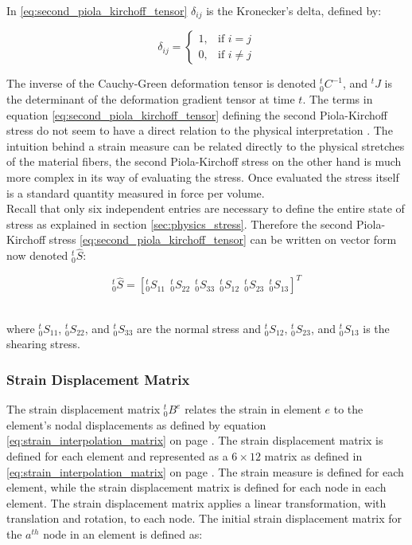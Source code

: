 In \eqref{eq:second_piola_kirchoff_tensor} $\delta_{ij}$ is the
Kronecker's delta, defined by:

\begin{equation}
  \delta_{ij} = \left\{\begin{matrix} 1, & \mbox{if } i=j \\ 0, &
      \mbox{if } i \ne j \end{matrix}\right. 
\end{equation}

The inverse of the Cauchy-Green deformation tensor is denoted
$^t_0C^{-1}$, and $^tJ$ is the determinant of the
deformation gradient tensor at time $t$.
%
The terms in equation \eqref{eq:second_piola_kirchoff_tensor} defining
the second Piola-Kirchoff stress do not seem to have a 
direct relation to the physical interpretation
. The intuition behind a strain
measure can be related directly to the physical stretches of the
material fibers, the second Piola-Kirchoff stress on the other hand is
much more complex in its way of evaluating the stress. Once evaluated
the stress itself is a standard quantity measured in force per volume. \\

Recall that only six independent entries are necessary to define the
entire state of stress as explained in section
\vref{sec:physics_stress}. Therefore the second Piola-Kirchoff
stress \eqref{eq:second_piola_kirchoff_tensor} can be written on
vector form now denoted $^t_0\hat{S}$:

\begin{equation*}
\label{eq:stress_tensor_vector_form}
^t_0\hat{S} = [^t_0S_{11} \ \ ^t_0S_{22} \ \ ^t_0S_{33} \ \ 
^t_0S_{12} \ \ ^t_0S_{23} \ \ ^t_0S_{13}]^T
\end{equation*} \

where $^t_0S_{11}$, $^t_0S_{22}$, and $^t_0S_{33}$ are the normal
stress and $^t_0S_{12}$, $^t_0S_{23}$, and $^t_0S_{13}$ is the
shearing stress.

\subsubsection*{Strain Displacement Matrix}
The strain displacement matrix $^t_0B^{e}$ relates the strain in
element $e$ to the element's nodal displacements as defined by
equation \eqref{eq:strain_interpolation_matrix} on page
\pageref{eq:strain_interpolation_matrix}. 
The strain displacement 
matrix is defined for each element and represented as a $6 \times 12$
matrix as defined in \eqref{eq:strain_interpolation_matrix} on page
\pageref{eq:strain_interpolation_matrix}. 
%
The strain measure is defined for each element, while the strain
displacement matrix is defined for 
each node in each element. The strain displacement matrix applies a
linear transformation, with translation and rotation, to each node.
The initial strain displacement matrix for the $a^{th}$ node in an
element is defined as:

